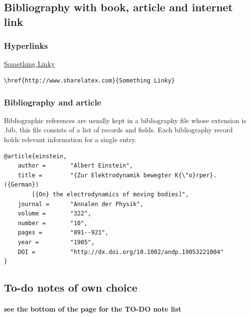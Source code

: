 \subsection{Bibliography with book, article and internet link}
\subsubsection{Hyperlinks}
\href{http://www.sharelatex.com}{Something Linky}
\begin{verbatim}
\href{http://www.sharelatex.com}{Something Linky}
\end{verbatim}
    
\subsubsection{Bibliography and article}
Bibliographic references are usually kept in a bibliography file whose extension is .bib, this file consists of a list of records and fields. Each bibliography record holds relevant information for a single entry. 


\begin{verbatim}
@article{einstein,
    author =       "Albert Einstein",
    title =        "{Zur Elektrodynamik bewegter K{\"o}rper}. ({German})
        [{On} the electrodynamics of moving bodies]",
    journal =      "Annalen der Physik",
    volume =       "322",
    number =       "10",
    pages =        "891--921",
    year =         "1905",
    DOI =          "http://dx.doi.org/10.1002/andp.19053221004"
}
\end{verbatim}

\subsection{To-do notes of own choice}

\paragraph{see the bottom of the page for the TO-DO note list}

\lipsum[11]
\lipsum[11]
\lipsum[11]
\lipsum[11]
\lipsum[11]
\lipsum[11]
\newpage